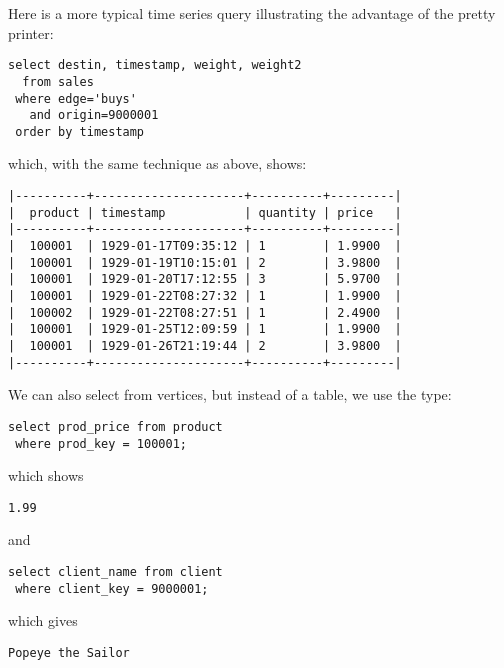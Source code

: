 Here is a more typical time series query illustrating
the advantage of the pretty printer:

\begin{sqlcode}
\begin{lstlisting}
select destin, timestamp, weight, weight2
  from sales 
 where edge='buys' 
   and origin=9000001 
 order by timestamp
\end{lstlisting}
\end{sqlcode}

\begin{minipage}{\textwidth}
which, with the same technique as above, shows:
\begin{verbatim}
|----------+---------------------+----------+---------|
|  product | timestamp           | quantity | price   |
|----------+---------------------+----------+---------|
|  100001  | 1929-01-17T09:35:12 | 1        | 1.9900  |
|  100001  | 1929-01-19T10:15:01 | 2        | 3.9800  |
|  100001  | 1929-01-20T17:12:55 | 3        | 5.9700  |
|  100001  | 1929-01-22T08:27:32 | 1        | 1.9900  |
|  100002  | 1929-01-22T08:27:51 | 1        | 2.4900  |
|  100001  | 1929-01-25T12:09:59 | 1        | 1.9900  |
|  100001  | 1929-01-26T21:19:44 | 2        | 3.9800  |
|----------+---------------------+----------+---------|
\end{verbatim}
\end{minipage}

We can also select from vertices,
but instead of a table, we use the type:

\begin{sqlcode}
\begin{lstlisting}
select prod_price from product
 where prod_key = 100001;
\end{lstlisting}
\end{sqlcode}

which shows
\begin{verbatim}
1.99
\end{verbatim}

and

\begin{sqlcode}
\begin{lstlisting}
select client_name from client
 where client_key = 9000001;
\end{lstlisting}
\end{sqlcode}

which gives
\begin{verbatim}
Popeye the Sailor
\end{verbatim}

